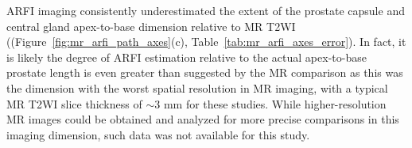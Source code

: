 ARFI imaging consistently underestimated the extent of the prostate capsule and 
central gland apex-to-base dimension relative to MR T2WI ((Figure~\ref{fig:mr_arfi_path_axes}(c), 
Table~\ref{tab:mr_arfi_axes_error}).  In fact, it is likely the degree of ARFI estimation relative 
to the actual apex-to-base prostate length is even greater than suggested by the MR comparison as this 
was the dimension with the worst spatial resolution in MR imaging, with a
typical MR T2WI slice thickness of $\sim$3 mm for these studies.  While
higher-resolution MR images could be obtained and analyzed for more precise
comparisons in this imaging dimension, such data was not available for this
study. 
